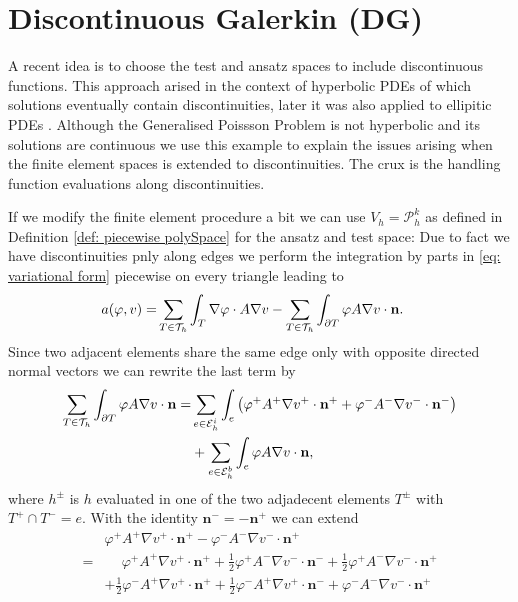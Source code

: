 \section{Discontinuous Galerkin (DG)} \label{sec: SIPG}
A recent idea is to choose the test and ansatz spaces to include discontinuous functions. This approach arised in the context of hyperbolic PDEs of which solutions eventually contain discontinuities, later it was also applied to ellipitic PDEs \cite{ABC+2002}. Although the Generalised Poissson Problem is not hyperbolic and its solutions are continuous we use this example to explain the issues arising when the finite element spaces is extended to discontinuities. The crux is the handling function evaluations along discontinuities.

If we modify the finite element procedure a bit we can use $V_h = \mathcal P_h^k$ as defined in Definition \ref*{def: piecewise polySpace} for the ansatz and test space: Due to fact we have discontinuities pnly along edges we perform the integration by parts in \eqref{eq: variational form} piecewise on every triangle leading to
\begin{align}
	a(\varphi, v) = & \sum_{T \in \mathcal{T}_h} \int_T \nabla \varphi \cdot A \nabla v - \sum_{T \in \mathcal{T}_h} \int_{\partial T} \varphi A \nabla v \cdot \mathbf n.
\end{align}
Since two adjacent elements share the same edge only with opposite directed normal vectors we can rewrite the last term by
\begin{align*}
\sum\limits_{T \in \mathcal{T}_h}\int_{\partial T} \varphi A \nabla v \cdot \mathbf n 
= &\sum\limits_{e \in \mathcal{E}_h^i}\int_{e} \left( \varphi^+ A^+ \nabla v^+ \cdot \mathbf n^+ + \varphi^- A^- \nabla v^- \cdot \mathbf n^- \right) \\
& + \sum\limits_{e \in \mathcal{E}_h^b}\int_{e} \varphi A \nabla v \cdot \mathbf n,
\end{align*}
where $h^\pm $ is $h$ evaluated in one of the two adjadecent elements $T^\pm$ with $T^+ \cap T^- = e$. With the identity $\mathbf n^- = -\mathbf n^+$ we can extend
\begin{align*}
	&\varphi^+ A^+ \nabla v^+ \cdot \mathbf n^+ - \varphi^- A^- \nabla v^- \cdot \mathbf n^+ \\
		= & \phantom{+} \varphi^+ A^+ \nabla v^+ \cdot \mathbf n^+ 
		     + \frac 1 2  \varphi^+ A^- \nabla v^- \cdot \mathbf n^- + \frac 1 2 \varphi^+ A^- \nabla v^- \cdot \mathbf n^+ \\
		& + \frac 1 2  \varphi^- A^+ \nabla v^+ \cdot \mathbf n^+ + \frac 1 2 \varphi^- A^+ \nabla v^+ \cdot \mathbf n^-
		   + \varphi^- A^- \nabla v^- \cdot \mathbf n^+
\end{align*}
